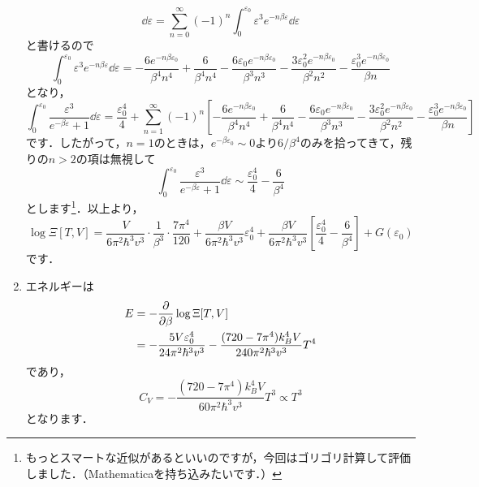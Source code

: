 \documentclass[a4paper,pdflatex,ja=standard]{bxjsarticle}
\begin{document}
\begin{enumerate}
\begin{equation}
    \dd \varepsilon
    =
    \sum_{n=0}^{\infty}
    (-1)^n
    \int_0^{\varepsilon_0}
    \varepsilon^3 e^{-n\beta\varepsilon}
    \dd \varepsilon
  \end{equation}
  と書けるので
  \begin{equation}    
    \int_0^{\varepsilon_0}
    \varepsilon^3 e^{-n\beta\varepsilon}
    \dd \varepsilon
    =
    -\frac{6 e^{-n\beta\varepsilon_0}}{\beta^4 n^4}+\frac{6}{\beta^4
    n^4}-\frac{6 \varepsilon_0 e^{-n\beta\varepsilon_0}}{\beta^3
    n^3}-\frac{3 \varepsilon_0^2 e^{-n\beta\varepsilon_0}}{\beta^2
    n^2}-\frac{\varepsilon_0^3 e^{-n\beta\varepsilon_0}}{\beta  n}
  \end{equation}
  となり，
  \begin{equation}    
    \int_0^{\varepsilon_0}
    \frac{\varepsilon^3}{e^{-\beta\varepsilon}+1}
    \dd \varepsilon
    =
    \frac{\varepsilon_0^4}{4}
    +
    \sum_{n=1}^{\infty}
    (-1)^n
    \left[ 
      -\frac{6 e^{-n\beta\varepsilon_0}}{\beta^4 n^4}+\frac{6}{\beta^4
      n^4}-\frac{6 \varepsilon_0 e^{-n\beta\varepsilon_0}}{\beta^3
      n^3}-\frac{3 \varepsilon_0^2 e^{-n\beta\varepsilon_0}}{\beta^2
      n^2}-\frac{\varepsilon_0^3 e^{-n\beta\varepsilon_0}}{\beta  n}
    \right]
  \end{equation}
  です．したがって，$n=1$のときは，$e^{-\beta\varepsilon_0}\sim 0$より$6/\beta^4$のみを拾ってきて，残りの$n>2$の項は無視して
  \begin{equation}
    \int_0^{\varepsilon_0}
    \frac{\varepsilon^3}{e^{-\beta\varepsilon}+1}
    \dd \varepsilon
    \sim
    \frac{\varepsilon_0^4}{4}
    -
    \frac{6}{\beta^4}    
  \end{equation}
  とします\footnote{
    もっとスマートな近似があるといいのですが，今回はゴリゴリ計算して評価しました．（Mathematicaを持ち込みたいです．）
  }．以上より，
  \begin{equation}
    \log \Xi[T,V]
    =
    \frac{V}{6\pi^2\hbar^3 v^3}
    \cdot
    \frac{1}{\beta^3}\cdot\frac{7\pi^4}{120}
    +
    \frac{\beta V}{6\pi^2\hbar^3 v^3}\varepsilon_0^4
    +
    \frac{\beta V}{6\pi^2\hbar^3 v^3}
    \left[  
      \frac{\varepsilon_0^4}{4}
      -
      \frac{6}{\beta^4}    
    \right]
    +
    G(\varepsilon_0)
  \end{equation}
  です．


  \item 

  エネルギーは
  \begin{align}
    E
    &=
    -\pdv{}{\beta}
    \log\Xi[T,V]
    \nonumber
    \\
    &=
    -
    \frac{5V\varepsilon_0^4}{24\pi^2\hbar^3v^3}
    -
    \frac{(720-7\pi^4)k_B^4V}{240\pi^2\hbar^3v^3}T^4
  \end{align}
  であり，
  \begin{equation}
    C_V
    =
    -
    \frac{(720-7\pi^4)k_B^4V}{60\pi^2\hbar^3v^3}T^3    
    \propto
    T^3
  \end{equation}
  となります．



\end{enumerate}
\end{document}
